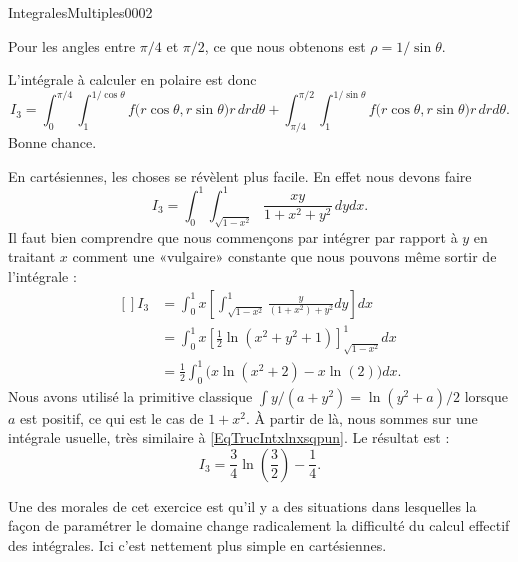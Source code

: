 \begin{corrige}{IntegralesMultiples0002}
\begin{enumerate}
			Pour les angles entre $\pi/4$ et $\pi/2$, ce que nous obtenons est $\rho=1/\sin\theta$.

			L'intégrale à calculer en polaire est donc
			\begin{equation}
				I_3=\int_{0}^{\pi/4}\int_1^{1/\cos\theta} f\big( r\cos\theta,r\sin\theta \big)r\,drd\theta+\int_{\pi/4}^{\pi/2}\int_1^{1/\sin\theta} f\big( r\cos\theta,r\sin\theta \big)r\,drd\theta.
			\end{equation}
			Bonne chance.

			En cartésiennes, les choses se révèlent plus facile. En effet nous devons faire
			\begin{equation}
				I_3=\int_0^1\int_{\sqrt{1-x^2}}^1\frac{ xy }{ 1+x^2+y^2 }\,dydx.
			\end{equation}
			Il faut bien comprendre que nous commençons par intégrer par rapport à $y$ en traitant $x$ comment une «vulgaire» constante que nous pouvons même sortir de l'intégrale :
			\begin{equation}
				\begin{aligned}[]
					I_3&=\int_0^1 x\left[ \int_{\sqrt{1-x^2}}^1\frac{ y }{ (1+x^2)+y^2 }dy \right]dx\\
					&=\int_0^1 x \left[ \frac{ 1 }{2}\ln(x^2+y^2+1) \right]_{\sqrt{1-x^2}}^1dx\\
					&=\frac{ 1 }{2}\int_0^1\Big( x\ln(x^2+2)-x \ln(2) \Big) dx.
				\end{aligned}
			\end{equation}
			Nous avons utilisé la primitive classique $\int y/(a+y^2)=\ln(y^2+a)/2$ lorsque $a$ est positif, ce qui est le cas de $1+x^2$. À partir de là, nous sommes sur une intégrale usuelle, très similaire à \eqref{EqTrucIntxlnxsqpun}. Le résultat est :
			\begin{equation}
				I_3=\frac{ 3 }{ 4 }\ln\left( \frac{ 3 }{ 2 } \right)-\frac{1}{ 4 }.
			\end{equation}

			Une des morales de cet exercice est qu'il y a des situations dans lesquelles la façon de paramétrer le domaine change radicalement la difficulté du calcul effectif des intégrales. Ici c'est nettement plus simple en cartésiennes.


\end{enumerate}
\end{corrige}
